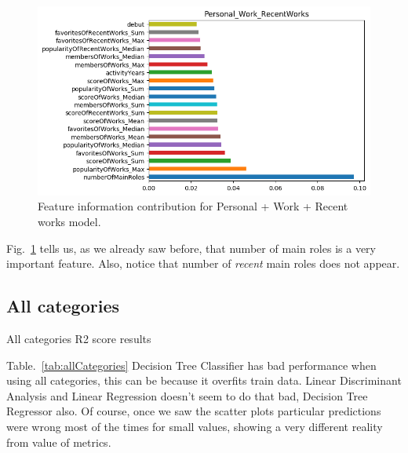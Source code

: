 \begin{figure}[!hbt]
	\centering
	\includegraphics[width=\columnwidth]{graphics/Personal_Work_RecentWorks_DTC_featureImportances.png}
	\caption{Feature information contribution for Personal + Work + Recent works model.}
	\label{fig:DTC_PWR}
\end{figure}

Fig.~\ref{fig:DTC_PWR} tells us, as we already saw before, that number of main roles is a very important feature. Also, notice that number of \textit{recent} main roles does not appear.

\FloatBarrier
\subsection{All categories}
\begin{table}[!hbt]
	\begin{center}
	\caption{All categories R2 score results}
	\label{tab:allCategories}
	
	\end{center}
\end{table}

Table.~\ref{tab:allCategories} Decision Tree Classifier has bad performance when using all categories, this can be because it overfits train data. Linear Discriminant Analysis and Linear Regression doesn't seem to do that bad, Decision Tree Regressor also. Of course, once we saw the scatter plots particular predictions were wrong most of the times for small values, showing a very different reality from value of metrics.


